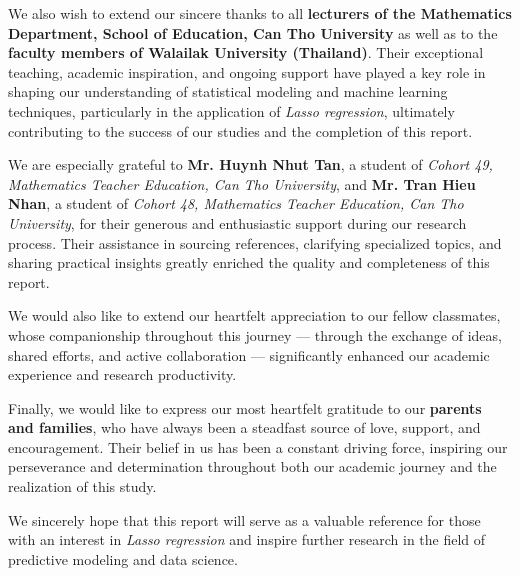 \documentclass[12pt, a4paper]{report}
\begin{document}
\medskip

\noindent
\par We also wish to extend our sincere thanks to all \textbf{lecturers of the Mathematics Department, School of Education, Can Tho University} as well as to the \textbf{faculty members of Walailak University (Thailand)}. Their exceptional teaching, academic inspiration, and ongoing support have played a key role in shaping our understanding of statistical modeling and machine learning techniques, particularly in the application of \textit{Lasso regression}, ultimately contributing to the success of our studies and the completion of this report.

\medskip

\noindent
\par We are especially grateful to \textbf{Mr. Huynh Nhut Tan}, a student of \textit{Cohort 49, Mathematics Teacher Education, Can Tho University}, and \textbf{Mr. Tran Hieu Nhan}, a student of \textit{Cohort 48, Mathematics Teacher Education, Can Tho University}, for their generous and enthusiastic support during our research process. Their assistance in sourcing references, clarifying specialized topics, and sharing practical insights greatly enriched the quality and completeness of this report.

\medskip

\noindent
\par We would also like to extend our heartfelt appreciation to our fellow classmates, whose companionship throughout this journey — through the exchange of ideas, shared efforts, and active collaboration — significantly enhanced our academic experience and research productivity.

\medskip

\noindent
\par Finally, we would like to express our most heartfelt gratitude to our \textbf{parents and families}, who have always been a steadfast source of love, support, and encouragement. Their belief in us has been a constant driving force, inspiring our perseverance and determination throughout both our academic journey and the realization of this study.

\medskip

\noindent
\par We sincerely hope that this report will serve as a valuable reference for those with an interest in \textit{Lasso regression} and inspire further research in the field of predictive modeling and data science.
\end{document}
